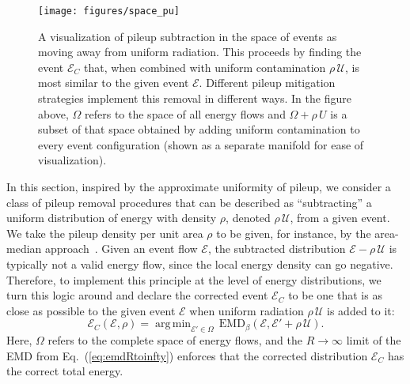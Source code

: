 \documentclass[letterpaper,11pt]{article}
\DeclareMathOperator*{\argmin}{arg\,min}
\newcommand{\E}{\mathcal{E}}
\DeclareRobustCommand{\Eq}[1]{Eq.~(\ref{#1})}
\newcommand{\EMD}{\text{EMD}\xspace}
\begin{document}
\begin{figure}[t]
\centering
\texttt{[image: figures/space\_pu]}
\caption{
\label{fig:spacepu}
A visualization of pileup subtraction in the space of events as moving away from uniform radiation.
%
This proceeds by finding the event $\mathcal{E}_C$ that, when combined with uniform contamination $\rho \, \mathcal{U}$, is most similar to the given event $\mathcal{E}$.
%
Different pileup mitigation strategies implement this removal in different ways.
%
In the figure above, $\Omega$ refers to the space of all energy flows and $\Omega + \rho \, U$ is a subset of that space obtained by adding uniform contamination to every event configuration (shown as a separate manifold for ease of visualization). 
}
\end{figure}


In this section, inspired by the approximate uniformity of pileup, we consider a class of pileup removal procedures that can be described as ``subtracting'' a uniform distribution of energy with density $\rho$, denoted $\rho\,\mathcal U$, from a given event.
%
We take the pileup density per unit area $\rho$ to be given, for instance, by the area-median approach~\cite{Cacciari:2007fd}.
%
Given an event flow $\mathcal E$, the subtracted distribution $\mathcal E - \rho \, \mathcal{U}$ is typically not a valid energy flow, since the local energy density can go negative.
%
Therefore, to implement this principle at the level of energy distributions, we turn this logic around and declare the corrected event $\mathcal{E}_C$ to be one that is as close as possible to the given event $\E$ when uniform radiation $\rho\,\mathcal U$ is added to it:
%
\begin{equation}
\label{eq:pileupemd}
\E_C(\E, \rho)  = \argmin_{\E' \in \Omega}\,\EMD_\beta(\E,\E' + \rho\,\mathcal U).
\end{equation}
%
Here, $\Omega$ refers to the complete space of energy flows, and the $R\to\infty$ limit of the EMD from \Eq{eq:emdRtoinfty} enforces that the corrected distribution $\E_C$ has the correct total energy.
\end{document}
